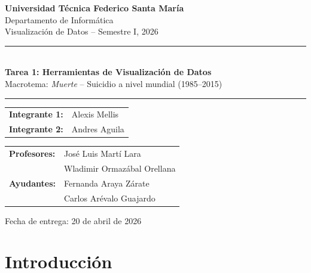 \documentclass[12pt, letterpaper]{article}
\begin{document}
\begin{titlepage}
  \centering
  \vspace*{1.5cm}

  {\Large\bfseries Universidad Técnica Federico Santa María}\\[0.3cm]
  {\large Departamento de Informática}\\[0.2cm]
  {\large Visualización de Datos -- Semestre I, 2026}

  \vspace{1.5cm}
  \rule{\linewidth}{0.5pt}\\[0.4cm]
  {\LARGE\bfseries Tarea 1: Herramientas de Visualización de Datos}\\[0.2cm]
  {\large Macrotema: \textit{Muerte} -- Suicidio a nivel mundial (1985--2015)}
  \rule{\linewidth}{0.5pt}

  \vspace{1.5cm}

  \begin{tabular}{ll}
    \textbf{Integrante 1:} & Alexis Mellis \\[0.2cm]
    \textbf{Integrante 2:} & Andres Aguila \\
  \end{tabular}

  \vspace{1cm}

  \begin{tabular}{ll}
    \textbf{Profesores:}  & José Luis Martí Lara \\
                          & Wladimir Ormazábal Orellana \\[0.3cm]
    \textbf{Ayudantes:}   & Fernanda Araya Zárate \\
                          & Carlos Arévalo Guajardo \\
  \end{tabular}

  \vfill

  {\large Fecha de entrega: 20 de abril de 2026}
\end{titlepage}

\tableofcontents
\newpage

\section{Introducción}
\end{document}
